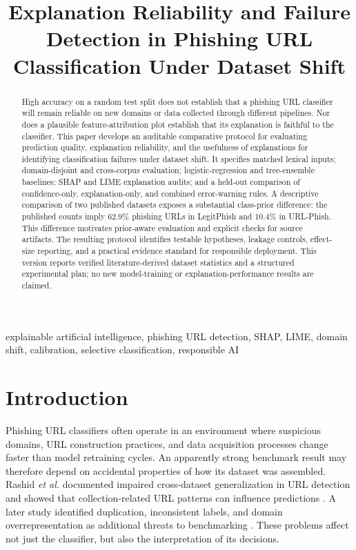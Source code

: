 \documentclass[conference,letterpaper]{IEEEtran}
\begin{document}
\title{Explanation Reliability and Failure Detection in Phishing URL Classification Under Dataset Shift}
\author{
}
\maketitle
\begin{abstract}
High accuracy on a random test split does not establish that a phishing URL classifier will remain reliable on new domains or data collected through different pipelines. Nor does a plausible feature-attribution plot establish that its explanation is faithful to the classifier. This paper develops an auditable comparative protocol for evaluating prediction quality, explanation reliability, and the usefulness of explanations for identifying classification failures under dataset shift. It specifies matched lexical inputs; domain-disjoint and cross-corpus evaluation; logistic-regression and tree-ensemble baselines; SHAP and LIME explanation audits; and a held-out comparison of confidence-only, explanation-only, and combined error-warning rules. A descriptive comparison of two published datasets exposes a substantial class-prior difference: the published counts imply 62.9\% phishing URLs in LegitPhish and 10.4\% in URL-Phish. This difference motivates prior-aware evaluation and explicit checks for source artifacts. The resulting protocol identifies testable hypotheses, leakage controls, effect-size reporting, and a practical evidence standard for responsible deployment. This version reports verified literature-derived dataset statistics and a structured experimental plan; no new model-training or explanation-performance results are claimed.
\end{abstract}
\begin{IEEEkeywords}
explainable artificial intelligence, phishing URL detection, SHAP, LIME, domain shift, calibration, selective classification, responsible AI
\end{IEEEkeywords}

\section{Introduction}
Phishing URL classifiers often operate in an environment where suspicious domains, URL construction practices, and data acquisition processes change faster than model retraining cycles. An apparently strong benchmark result may therefore depend on accidental properties of how its dataset was assembled. Rashid \emph{et al.} documented impaired cross-dataset generalization in URL detection and showed that collection-related URL patterns can influence predictions \cite{rashid2024}. A later study identified duplication, inconsistent labels, and domain overrepresentation as additional threats to benchmarking \cite{datasetquality2025}. These problems affect not just the classifier, but also the interpretation of its decisions.
\end{document}
